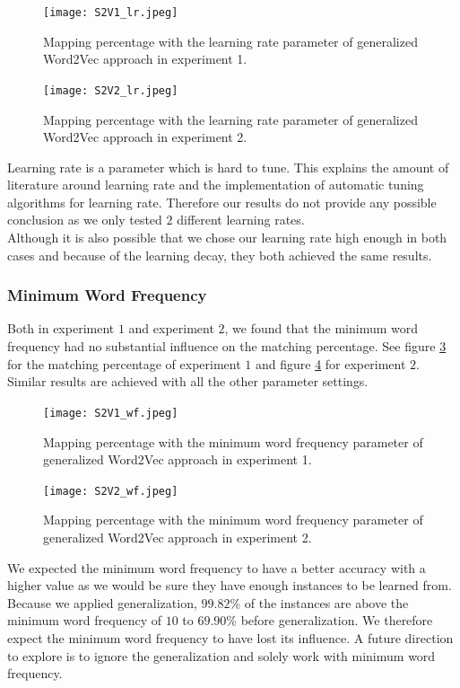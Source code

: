 \begin{figure}[!htb]
	\centering
	\texttt{[image: S2V1\_lr.jpeg]}
	\caption{Mapping percentage with the learning rate parameter of generalized Word2Vec approach in experiment 1.}
	\label{fig:s2v_lr_1}
\end{figure}

\begin{figure}[!htb]
	\centering
	\texttt{[image: S2V2\_lr.jpeg]}
	\caption{Mapping percentage with the learning rate parameter of generalized Word2Vec approach in experiment 2.}
	\label{fig:s2v_lr_2}
\end{figure}

Learning rate is a parameter which is hard to tune. This explains the amount of literature around learning rate and the implementation of automatic tuning algorithms for learning rate. Therefore our results do not provide any possible conclusion as we only tested $2$ different learning rates. \\
Although it is also possible that we chose our learning rate high enough in both cases and because of the learning decay, they both achieved the same results.

\subsubsection{Minimum Word Frequency}

Both in experiment $1$ and experiment $2$, we found that the minimum word frequency had no substantial influence on the matching percentage. See figure \ref{fig:s2v_wf_1} for the matching percentage of experiment $1$ and figure \ref{fig:s2v_wf_2} for experiment $2$. Similar results are achieved with all the other parameter settings. \\

\begin{figure}[!htb]
	\centering
	\texttt{[image: S2V1\_wf.jpeg]}
	\caption{Mapping percentage with the minimum word frequency parameter of generalized Word2Vec approach in experiment 1.}
	\label{fig:s2v_wf_1}
\end{figure}

\begin{figure}[!htb]
	\centering
	\texttt{[image: S2V2\_wf.jpeg]}
	\caption{Mapping percentage with the minimum word frequency parameter of generalized Word2Vec approach in experiment 2.}
	\label{fig:s2v_wf_2}
\end{figure}

We expected the minimum word frequency to have a better accuracy with a higher value as we would be sure they have enough instances to be learned from. Because we applied generalization, $99.82$\% of the instances are above the minimum word frequency of $10$ to $69.90$\% before generalization. We therefore expect the minimum word frequency to have lost its influence. A future direction to explore is to ignore the generalization and solely work with minimum word frequency.

